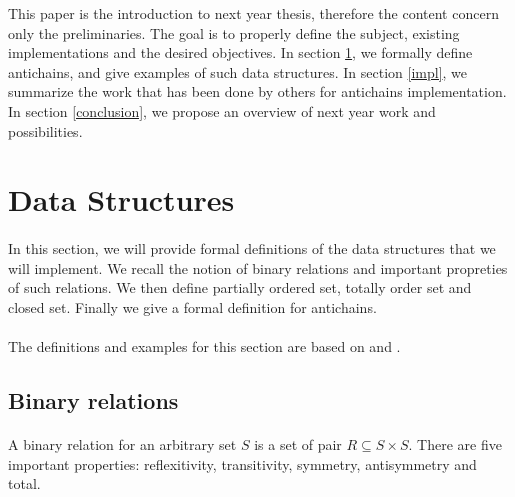\documentclass[letterpaper]{article}
\theoremstyle{definition}
\begin{document}
This paper is the introduction to next year thesis, therefore
the content concern only the preliminaries. The goal is to
properly define the subject,
existing implementations and the desired objectives.
In section \ref{data_structures}, we formally define antichains,
and give examples of such data structures. In section \ref{impl},
we summarize the work that has been done by others
for antichains implementation. In section \ref{conclusion}, we propose
an overview of next year work and possibilities.

\newpage

\section{Data Structures}

\label{data_structures}

\paragraph{}

In this section, we will provide formal definitions of the data
structures that we will implement. We recall the notion of binary relations
and important propreties of such relations.
We then define partially ordered set, totally order set and closed set.
Finally we give a formal definition for antichains.

\paragraph{}

The definitions and examples for this section are based on \cite{bohy_phd}
and \cite{maquet_phd}.


\subsection{Binary relations}

\paragraph{}

A binary relation for an arbitrary set $S$ is
a set of pair $R \subseteq S \times S$.
There are five important properties: reflexitivity, transitivity,
symmetry, antisymmetry and total.

\paragraph{}
\end{document}
